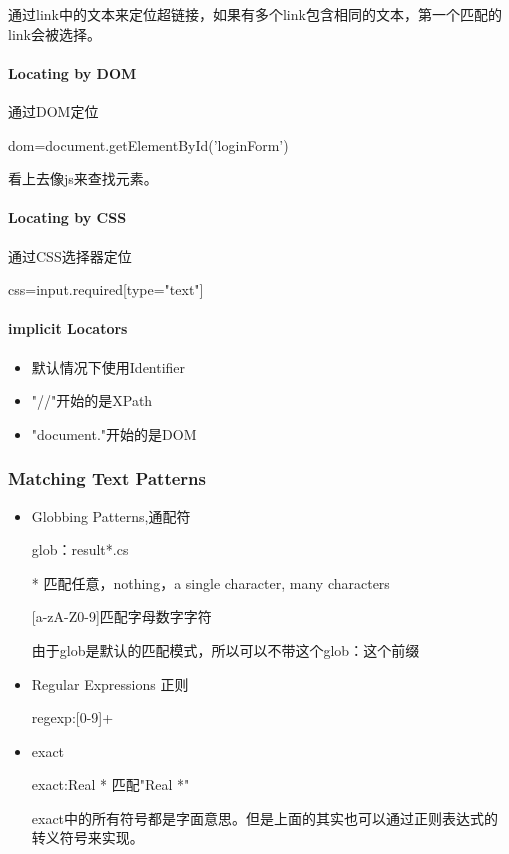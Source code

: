 通过link中的文本来定位超链接，如果有多个link包含相同的文本，第一个匹配的link会被选择。

\paragraph{Locating by DOM} 通过DOM定位

dom=document.getElementById('loginForm')

看上去像js来查找元素。

\paragraph{Locating by CSS} 通过CSS选择器定位

css=input.required[type="text"]

\paragraph{implicit Locators}
\begin{itemize}
\item 默认情况下使用Identifier
\item "//"开始的是XPath
\item "document."开始的是DOM
\end{itemize}

\subsubsection{Matching Text Patterns}
\begin{itemize}
\item Globbing Patterns,通配符

glob：result*.cs

* 匹配任意，nothing，a single character, many characters

[a-zA-Z0-9]匹配字母数字字符

由于glob是默认的匹配模式，所以可以不带这个glob：这个前缀

\item Regular Expressions 正则

regexp:[0-9]+

\item exact

exact:Real * 匹配"Real *"

exact中的所有符号都是字面意思。但是上面的其实也可以通过正则表达式的转义符号来实现。

\end{itemize}

